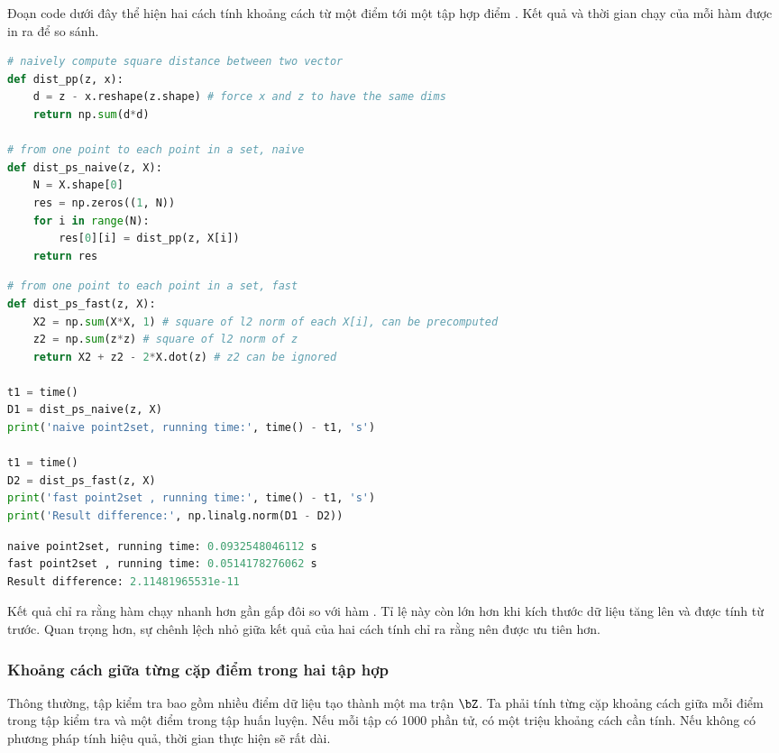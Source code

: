 Đoạn code dưới đây thể hiện hai cách tính khoảng cách từ một điểm
 tới một tập hợp điểm .
Kết quả và thời gian chạy của mỗi hàm được in ra để so sánh. 

\begin{lstlisting}[language=Python]
# naively compute square distance between two vector 
def dist_pp(z, x): 
    d = z - x.reshape(z.shape) # force x and z to have the same dims 
    return np.sum(d*d)

# from one point to each point in a set, naive 
def dist_ps_naive(z, X):
    N = X.shape[0]
    res = np.zeros((1, N)) 
    for i in range(N):
        res[0][i] = dist_pp(z, X[i])
    return res 
\end{lstlisting}
\begin{lstlisting}[language=Python]
# from one point to each point in a set, fast
def dist_ps_fast(z, X):
    X2 = np.sum(X*X, 1) # square of l2 norm of each X[i], can be precomputed
    z2 = np.sum(z*z) # square of l2 norm of z 
    return X2 + z2 - 2*X.dot(z) # z2 can be ignored

t1 = time() 
D1 = dist_ps_naive(z, X)
print('naive point2set, running time:', time() - t1, 's')

t1 = time() 
D2 = dist_ps_fast(z, X)
print('fast point2set , running time:', time() - t1, 's')
print('Result difference:', np.linalg.norm(D1 - D2))
\end{lstlisting}

\kq 
\begin{lstlisting}[language=Python]
naive point2set, running time: 0.0932548046112 s
fast point2set , running time: 0.0514178276062 s
Result difference: 2.11481965531e-11
\end{lstlisting}

Kết quả chỉ ra rằng hàm  chạy nhanh hơn gần
gấp đôi so với hàm . Tỉ lệ này còn lớn hơn
khi kích thước dữ liệu tăng lên và  được tính từ trước. Quan trọng hơn, sự chênh lệch nhỏ giữa kết quả của hai cách tính chỉ ra rằng  nên được ưu tiên hơn.

\subsubsection{Khoảng cách giữa từng cặp điểm trong hai tập hợp}
Thông thường, tập kiểm tra bao gồm nhiều điểm dữ liệu tạo thành một ma trận
$\bZ$. Ta phải tính từng cặp khoảng cách giữa mỗi điểm trong tập kiểm tra và một
điểm trong tập huấn luyện. Nếu mỗi tập có 1000 phần tử, có một triệu khoảng cách
cần tính. Nếu không có phương pháp tính hiệu quả, thời gian thực hiện sẽ rất dài.

